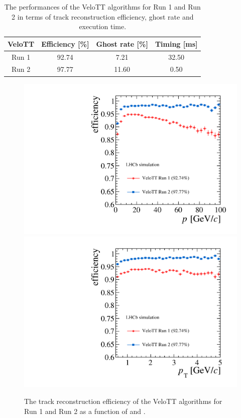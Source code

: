 \begin{table}[!b]
\caption{The performances of the VeloTT algorithms for Run 1 and Run 2 in terms of track reconstruction efficiency, ghost rate and execution time.}
\label{tab:perf_velott_comp}
\begin{center}
  \begin{tabular}{c|c|c|c}
    VeloTT & Efficiency [\%] & Ghost rate [\%] & Timing [ms] \\ 
    \hline
    Run 1  &  92.74  &  \hphantom{0}7.21  &  32.50  \\ 
    Run 2  &  97.77  &  11.60  &  \hphantom{0}0.50   \\ 
  \end{tabular}
\end{center}
\end{table}

\begin{figure}[!tb]
\begin{center}
  \includegraphics[width=0.45\linewidth]{figs/upstream-tracking-run2/VeloTT-eff-p.pdf}
  \includegraphics[width=0.45\linewidth]{figs/upstream-tracking-run2/VeloTT-eff-pt.pdf}
  \caption{The track reconstruction efficiency of the VeloTT algorithms for Run 1 and Run 2 as a function of \ptot and \pt.}
  \label{fig:eff_velott_comp}
  \end{center}
\end{figure}

